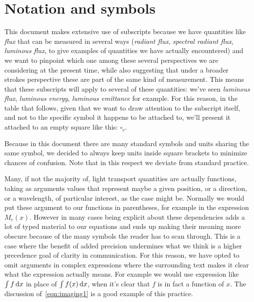 
\chapter{Notation and symbols}\label{ch:notation}

This document makes extensive use of subscripts because we have quantities like 
\emph{flux} that can be measured in several ways (\emph{radiant flux}, \emph{spectral radiant flux},
\emph{luminous flux}, to give examples of quantities we have actually encountered) and we
want to pinpoint which one among these several perspectives we are considering at the present time,
while also suggesting that under a broader strokes perspective these are part of the same
kind of measurement.
This means that these subscripts will apply to several of these quantities: we've seen
\emph{luminous flux}, \emph{luminous energy}, \emph{luminous emittance} for example.
For this reason, in the table that follows, given that we want to draw attention to 
the subscript itself, and not to the specific symbol it happens to be attached to, 
we'll present it attached to an empty square like this: $\square_v$.

Because in this document there are many standard symbols and units sharing the
same symbol, we decided to always keep units inside square brackets to minimize chances of 
confusion. Note that in this respect we deviate from standard practice.

Many, if not the majority of, light transport quantities are actually functions, 
taking as arguments values that represent maybe a given position, or a direction, or a wavelength,
of particular interest, as the case might be. 
Normally we would put these argument to our functions in parentheses, for example in the expression 
$M_e(x)$. 
However in many cases being explicit about these dependencies adds a lot of typed material 
to our equations and ends up making their meaning more obscure because of the many symbols the reader 
has to scan through. 
This is a case where the benefit of added precision undermines what we think is a higher precedence goal
of clarity in communication.
For this reason, we have opted to omit arguments in complex expressions where the surrounding 
text makes it clear what the expression actually means. 
For example we would use expression like $\int f \mathop{}\!\mathrm{d} x$ in place of
$\int f(x) \mathop{}\!\mathrm{d} x$, when it's clear that $f$ is in fact a function of $x$.
The discussion of~\cref{eqn:imaging1} is a good example of this practice.

